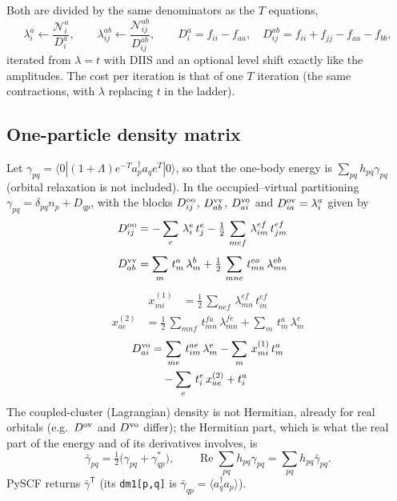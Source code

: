 \documentclass[11pt]{article}
\newcommand{\bra}[1]{\langle #1|}
\newcommand{\ket}[1]{|#1\rangle}
\begin{document}
Both are divided by the same denominators as the $T$ equations,
\begin{equation}
\lambda_i^a\leftarrow\frac{\mathcal N_i^a}{D_i^a},\qquad
\lambda_{ij}^{ab}\leftarrow\frac{\mathcal N_{ij}^{ab}}{D_{ij}^{ab}},\qquad
D_i^a=f_{ii}-f_{aa},\quad D_{ij}^{ab}=f_{ii}+f_{jj}-f_{aa}-f_{bb},
\end{equation}
iterated from $\lambda=t$ with DIIS and an optional level shift exactly like the amplitudes. The cost per iteration is that
of one $T$ iteration (the same contractions, with $\lambda$ replacing $t$ in the ladder).

\subsection{One-particle density matrix}

Let $\gamma_{pq}=\bra{0}(1+\Lambda)e^{-T}a_p^\dagger a_q e^{T}\ket{0}$, so that the one-body energy is
$\sum_{pq}h_{pq}\gamma_{pq}$ (orbital relaxation is not included). In the occupied--virtual partitioning
$\gamma_{pq}=\delta_{pq}n_p+D_{qp}$, with the blocks $D^{\rm oo}_{ij}$, $D^{\rm vv}_{ab}$, $D^{\rm vo}_{ai}$ and
$D^{\rm ov}_{ia}=\lambda_i^a$ given by
\begin{align*}
  D^{\rm oo}_{ij} &= -  \sum_{e}\,\lambda_{i}^{e}\,t_{j}^{e} - \tfrac{1}{2}\, \sum_{mef}\,\lambda_{im}^{ef}\,t_{jm}^{ef}
\end{align*}
\begin{align*}
  D^{\rm vv}_{ab} &=  \sum_{m}\,t_{m}^{a}\,\lambda_{m}^{b} + \tfrac{1}{2}\, \sum_{mne}\,t_{mn}^{ea}\,\lambda_{mn}^{eb}
\end{align*}
\begin{align*}
  x^{(1)}_{mi} &= \tfrac{1}{2}\, \sum_{nef}\,\lambda_{mn}^{ef}\,t_{in}^{ef}
\end{align*}
\begin{align*}
  x^{(2)}_{ae} &= \tfrac{1}{2}\, \sum_{mnf}\,t_{mn}^{fa}\,\lambda_{mn}^{fe} +  \sum_{m}\,t_{m}^{a}\,\lambda_{m}^{e}
\end{align*}
\begin{align*}
  D^{\rm vo}_{ai} &=  \sum_{me}\,t_{im}^{ae}\,\lambda_{m}^{e} -  \sum_{m}\,x^{(1)}_{mi}\,t_{m}^{a} \notag\\
  & \quad -  \sum_{e}\,t_{i}^{e}\,x^{(2)}_{ae} +  t_{i}^{a}
\end{align*}
The coupled-cluster (Lagrangian) density is not Hermitian, already for real orbitals (e.g.\ $D^{\rm ov}$ and
$D^{\rm vo}$ differ); the Hermitian part, which is what the real part of the energy and of its derivatives
involves, is
\begin{equation}
\bar\gamma_{pq}=\tfrac12\big(\gamma_{pq}+\gamma_{qp}^{*}\big),\qquad
\operatorname{Re}\sum_{pq}h_{pq}\gamma_{pq}=\sum_{pq}h_{pq}\bar\gamma_{pq}.
\end{equation}
PySCF returns $\bar\gamma^{\mathsf T}$ (its \texttt{dm1[p,q]} is $\bar\gamma_{qp}=\langle a_q^\dagger a_p\rangle$).
\end{document}
